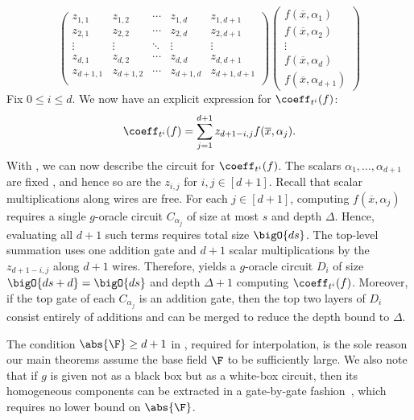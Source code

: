 \documentclass[letterpaper, 11pt]{amsart}
\begin{document}
\begin{pf}
\[\begin{pmatrix}
            z_{1, 1} & z_{1, 2} & \cdots & z_{1, d} & z_{1, d + 1} \\
            z_{2, 1} & z_{2, 2} & \cdots & z_{2, d} & z_{2, d + 1} \\
            \vdots & \vdots & \ddots & \vdots & \vdots \\
            z_{d, 1} & z_{d, 2} & \cdots & z_{d, d} & z_{d, d + 1} \\
            z_{d + 1, 1} & z_{d + 1, 2} & \cdots & z_{d + 1, d} & z_{d + 1, d + 1} \\
        \end{pmatrix}
        \begin{pmatrix}
            f(\overline{x},\alpha_1) \\
            f(\overline{x},\alpha_2) \\
            \vdots \\
            f(\overline{x},\alpha_d) \\
            f(\overline{x},\alpha_{d+1})
        \end{pmatrix} 
    \]
    Fix $0 \leq i \leq d$.
    We now have an explicit expression for $\coeff_{t^i}(f)$:
    \begin{equation}\label{eq:H_i_explicit}
        \coeff_{t^i}(f) = \sum_{j = 1}^{d + 1} z_{d + 1 - i, j} f(\overline{x},\alpha_j).
    \end{equation}
With , we can now describe the circuit for $\coeff_{t^i}(f)$.
The scalars $\alpha_1, \ldots, \alpha_{d+1}$ are fixed \apriori, and hence so are the $z_{i,j}$ for $i, j \in [d + 1]$.
Recall that scalar multiplications along wires are free.
For each $j \in [d + 1]$, computing $f(\overline{x},\alpha_j)$ requires a single $g$-oracle circuit $C_{\alpha_j}$ of size at most $s$ and depth $\Delta$.
Hence, evaluating all $d+1$ such terms requires total size $\bigO{ds}$.
The top-level summation uses one addition gate and $d+1$ scalar multiplications by the $z_{d + 1 - i, j}$ along $d+1$ wires.
Therefore,  yields a $g$-oracle circuit $D_i$ of size $\bigO{ds+d} = \bigO{ds}$ and depth $\Delta+1$ computing $\coeff_{t^i}(f)$.
Moreover, if the top gate of each $C_{\alpha_j}$ is an addition gate, then the top two layers of $D_i$ consist entirely of additions and can be merged to reduce the depth bound to $\Delta$.
\end{pf}

\begin{remark}
The condition $\abs{\F} \geq d + 1$ in , required for interpolation, is the sole reason our main theorems assume the base field $\F$ to be sufficiently large. 
We also note that if $g$ is given not as a black box but as a white-box circuit, then its homogeneous components can be extracted in a gate-by-gate fashion~\cite{Str73}, which requires no lower bound on $\abs{\F}$.
\end{remark}
\end{document}
